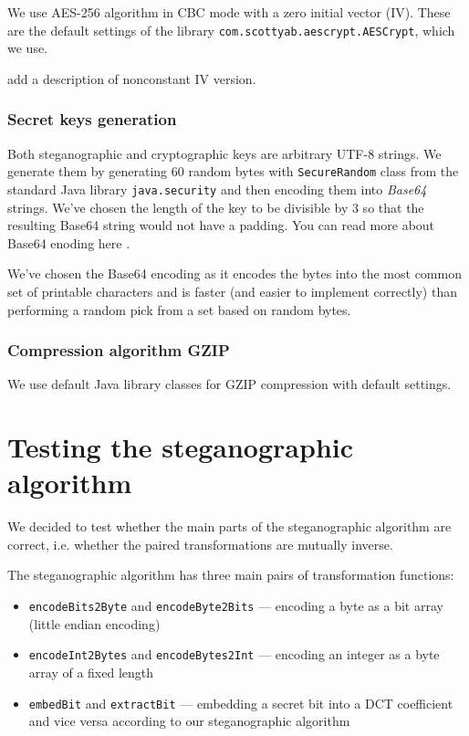 We use AES-256 algorithm in CBC mode with a zero initial vector (IV). These are the default
settings of the library \texttt{com.scottyab.aescrypt.AESCrypt}, which we use.

\TODO add a description of nonconstant IV version.

\subsubsection{Secret keys generation}
Both steganographic and cryptographic keys are arbitrary UTF-8 strings. We generate 
them by generating 60 random bytes with \texttt{SecureRandom} class from the standard
Java library \texttt{java.security} and then encoding them into \emph{Base64} strings.
We've chosen the length of the key to be divisible by $3$ so that the resulting
Base64 string would not have a padding. 
You can read more about Base64 enoding here \cite{josefsson2006base16}.

We've chosen the Base64 encoding as it encodes the bytes into the most common set
of printable characters and is faster (and easier to implement correctly) 
than performing a random pick from a set based on random bytes.

\subsubsection{Compression algorithm GZIP}

We use default Java library classes for GZIP compression with default settings.

\section{Testing the steganographic algorithm}

We decided to test whether the main parts of the steganographic algorithm
are correct, i.e. whether the paired transformations are mutually inverse.

The steganographic algorithm has three main pairs of transformation functions:
\begin{itemize}
    \item \texttt{encodeBits2Byte} and \texttt{encodeByte2Bits} 
        --- encoding a byte as a bit array (little endian encoding)
    \item \texttt{encodeInt2Bytes} and \texttt{encodeBytes2Int}
        --- encoding an integer as a byte array of a fixed length
    \item \texttt{embedBit} and \texttt{extractBit} 
        --- embedding a secret bit into a DCT coefficient and vice versa
        according to our steganographic algorithm
\end{itemize}

